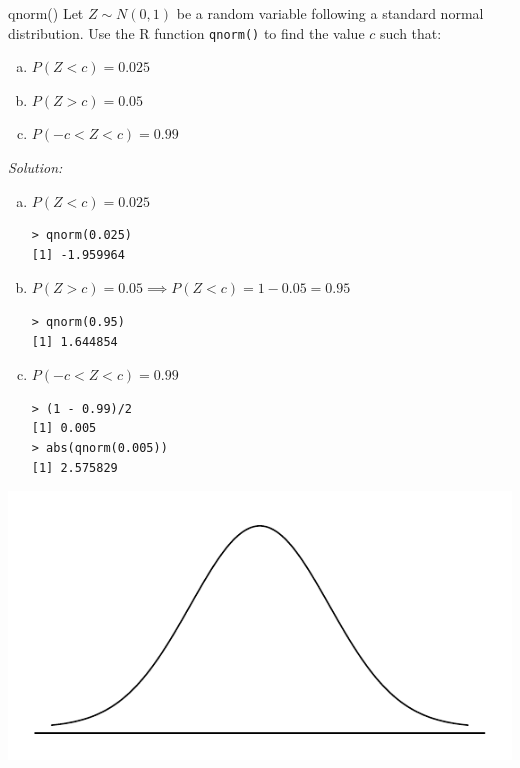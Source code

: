 \documentclass[10pt]{beamer}
\begin{document}
\begin{frame}[fragile]{qnorm()}
Let $Z \sim N(0,1)$ be a random variable following a standard normal distribution.  Use the R function \texttt{qnorm()} to find the value $c$ such that:\\
\begin{enumerate}[(a)]
\item $P(Z < c) = 0.025$
\item $P(Z > c) = 0.05$
\item $P(-c < Z < c) = 0.99$
\end{enumerate}
\end{frame}

\begin{frame}[fragile]{}
\emph{Solution:}
\begin{enumerate}[(a)]
\item $P(Z<c) = 0.025$
\begin{verbatim}
> qnorm(0.025)
[1] -1.959964
\end{verbatim}
\medskip
\item $P(Z > c) = 0.05 \implies P(Z < c) = 1-0.05 = 0.95$
\begin{verbatim}
> qnorm(0.95)
[1] 1.644854
\end{verbatim}
\medskip
\item $P(-c < Z < c) = 0.99$
\begin{verbatim}
> (1 - 0.99)/2
[1] 0.005
> abs(qnorm(0.005))
[1] 2.575829
\end{verbatim}
\end{enumerate}
\includegraphics[scale=0.5, right]{figure/norm_draw.pdf}
\vspace{0.25cm}
\end{frame}
\end{document}
